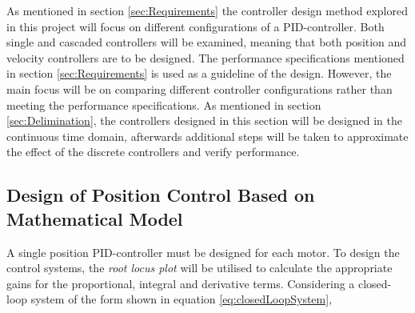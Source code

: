 \documentclass[../../main.tex]{subfiles}
\begin{document}
As mentioned in section \ref{sec:Requirements} the controller design method explored in this project will focus on different configurations of a PID-controller. Both single and cascaded controllers will be examined, meaning that both position and velocity controllers are to be designed. The performance specifications mentioned in section \ref{sec:Requirements} is used as a guideline of the design. However, the main focus will be on comparing different controller configurations rather than meeting the performance specifications. As mentioned in section \ref{sec:Delimination}, the controllers designed in this section will be designed in the continuous time domain, afterwards additional steps will be taken to approximate the effect of the discrete controllers and verify performance.


\subsection{Design of Position Control Based on Mathematical Model}
\label{subsec:position_control_model}
A single position PID-controller must be designed for each motor. To design the control systems, the \textit{root locus plot} will be utilised to calculate the appropriate gains for the proportional, integral and derivative terms. Considering a closed-loop system of the form shown in equation \ref{eq:closedLoopSystem},
\end{document}
